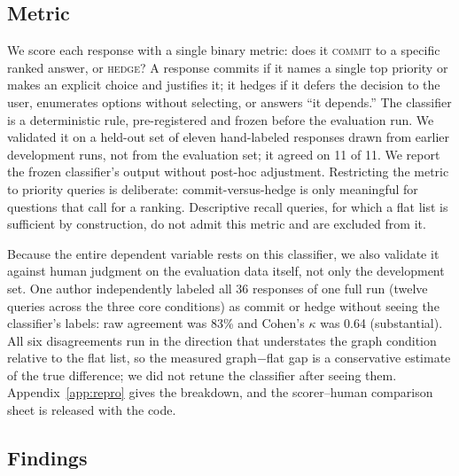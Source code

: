 \documentclass[11pt]{article}
\begin{document}
\subsection{Metric}

We score each response with a single binary metric: does it \textsc{commit} to a specific ranked answer, or \textsc{hedge}? A response commits if it names a single top priority or makes an explicit choice and justifies it; it hedges if it defers the decision to the user, enumerates options without selecting, or answers ``it depends.'' The classifier is a deterministic rule, pre-registered and frozen before the evaluation run. We validated it on a held-out set of eleven hand-labeled responses drawn from earlier development runs, not from the evaluation set; it agreed on 11 of 11. We report the frozen classifier's output without post-hoc adjustment. Restricting the metric to priority queries is deliberate: commit-versus-hedge is only meaningful for questions that call for a ranking. Descriptive recall queries, for which a flat list is sufficient by construction, do not admit this metric and are excluded from it.

Because the entire dependent variable rests on this classifier, we also validate it against human judgment on the evaluation data itself, not only the development set. One author independently labeled all 36 responses of one full run (twelve queries across the three core conditions) as commit or hedge without seeing the classifier's labels: raw agreement was 83\% and Cohen's $\kappa$ was 0.64 (substantial). All six disagreements run in the direction that understates the graph condition relative to the flat list, so the measured graph$-$flat gap is a conservative estimate of the true difference; we did not retune the classifier after seeing them. Appendix~\ref{app:repro} gives the breakdown, and the scorer--human comparison sheet is released with the code.

\subsection{Findings}
\end{document}
